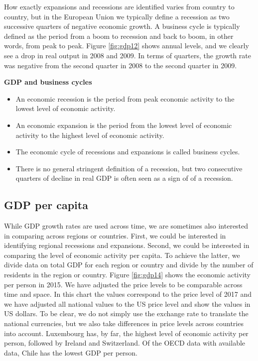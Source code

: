 \documentclass[]{book}
\providecommand{\tightlist}{%
  \setlength{\itemsep}{0pt}\setlength{\parskip}{0pt}}
\newenvironment{myblock}%
{%
 \begin{tcolorbox}%
}%
{\end{tcolorbox}}%
\begin{document}
How exactly expansions and recessions are identified varies from country to country, but in the European Union we typically define a recession as two successive quarters of negative economic growth. A business cycle is typically defined as the period from a boom to recession and back to boom, in other words, from peak to peak. Figure \ref{fig:gdp12} shows annual levels, and we clearly see a drop in real output in 2008 and 2009. In terms of quarters, the growth rate was negative from the second quarter in 2008 to the second quarter in 2009.

\begin{myblock}
\textbf{GDP and business cycles}

\begin{itemize}
\tightlist
\item
  An economic recession is the period from peak economic activity to the
  lowest level of economic activity.
\item
  An economic expansion is the period from the lowest level of economic
  activity to the highest level of economic activity.
\item
  The economic cycle of recessions and expansions is called business
  cycles.
\item
  There is no general stringent definition of a recession, but two
  consecutive quarters of decline in real GDP is often seen as a sign of
  of a recession.
\end{itemize}
\end{myblock}

\hypertarget{gdp-per-capita}{%
\subsection{GDP per capita}\label{gdp-per-capita}}

While GDP growth rates are used across time, we are sometimes also interested in comparing across regions or countries. First, we could be interested in identifying regional recessions and expansions. Second, we could be interested in comparing the level of economic activity per capita. To achieve the latter, we divide data on total GDP for each region or country and divide by the number of residents in the region or country. Figure \ref{fig:gdp14} shows the economic activity per person in 2015. We have adjusted the price levels to be comparable across time and space. In this chart the values correspond to the price level of 2017 and we have adjusted all national values to the US price level and show the values in US dollars. To be clear, we do not simply use the exchange rate to translate the national currencies, but we also take differences in price levels across countries into account. Luxembourg has, by far, the highest level of economic activity per person, followed by Ireland and Switzerland. Of the OECD data with available data, Chile has the lowest GDP per person.
\end{document}
